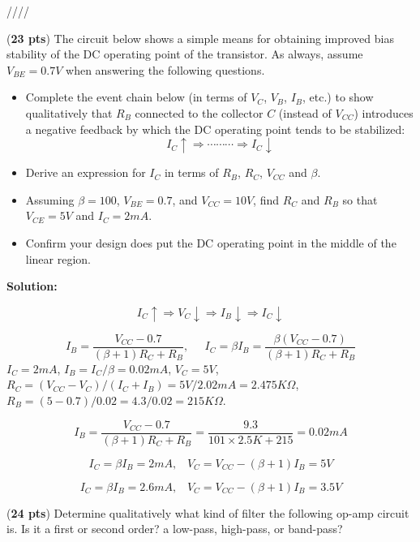 \begin{enumerate}
\begin{comment}
  \end{comment}



\end{enumerate}


////


\item ({\bf 23 pts})
  The circuit below shows a simple means for obtaining improved bias
  stability of the DC operating point of the transistor. As always,
  assume $V_{BE}=0.7V$ when answering the following questions.


  \begin{itemize}
  \item Complete the event chain below (in terms of $V_C$, $V_B$, $I_B$,
    etc.) to show qualitatively that $R_B$ connected to the collector $C$ 
    (instead of $V_{CC}$) introduces a negative feedback by which the DC
    operating point tends to be stabilized:
    \[
    I_C \uparrow \Longrightarrow \cdots\cdots\cdots \Longrightarrow I_C \downarrow     
    \]
  \item Derive an expression for $I_C$ in terms of $R_B$, $R_C$, $V_{CC}$
    and $\beta$.
  \item Assuming $\beta=100$, $V_{BE}=0.7$, and $V_{CC}=10V$, find $R_C$ 
    and $R_B$ so that $V_{CE}=5V$ and $I_C=2mA$.
  \item Confirm your design does put the DC operating point in the middle
    of the linear region.
  \end{itemize}


  {\bf Solution:}

  \[
  I_C \uparrow \Longrightarrow V_C \downarrow
  \Longrightarrow I_B \downarrow \Longrightarrow I_C \downarrow 
  \]

  \[
  I_B=\frac{V_{CC}-0.7}{(\beta+1)R_C+R_B},\;\;\;\;\;
  I_C=\beta I_B=\frac{\beta(V_{CC}-0.7)}{(\beta+1)R_C+R_B} 
  \]
  $I_C=2mA$, $I_B=I_C/\beta=0.02mA$, $V_C=5V$,
  $R_C=(V_{CC}-V_C)/(I_C+I_B)=5V/2.02mA=2.475K\Omega$,  
  $R_B=(5-0.7)/0.02=4.3/0.02=215K\Omega$.

  \[
  I_B=\frac{V_{CC}-0.7}{(\beta+1)R_C+R_B}=\frac{9.3}{101\times 2.5K+215}
  =0.02mA
  \]

  \[
  I_C=\beta I_B=2 mA,\;\;\;V_C=V_{CC}-(\beta+1)I_B=5V 
  \]

  \[
  I_C=\beta I_B=2.6mA,\;\;\;V_C=V_{CC}-(\beta+1)I_B=3.5V 
  \]

\item ({\bf 24 pts})
  Determine qualitatively what kind of filter the following op-amp
  circuit is. Is it a first or second order? a low-pass, high-pass, or 
  band-pass? 

